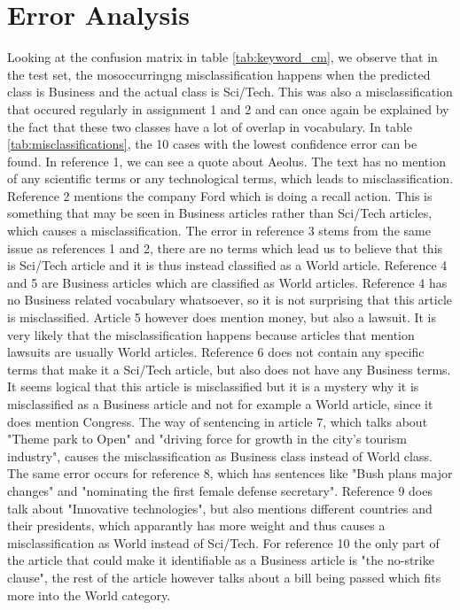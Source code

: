 \documentclass[12pt,a4paper,english]{article}
\begin{document}
\section{Error Analysis}
Looking at the confusion matrix in table \ref{tab:keyword_cm}, we observe that in the test set, the mosoccurringng misclassification happens when the predicted class is Business and the actual class is Sci/Tech. This was also a misclassification that occured regularly in assignment 1 and 2 and can once again be explained by the fact that these two classes have a lot of overlap in vocabulary. In table \ref{tab:misclassifications}, the 10 cases with the lowest confidence error can be found. In reference 1, we can see a quote about Aeolus. The text has no mention of any scientific terms or any technological terms, which leads to misclassification. Reference 2 mentions the company Ford which is doing a recall action. This is something that may be seen in Business articles rather than Sci/Tech articles, which causes a misclassification. The error in reference 3 stems from the same issue as references 1 and 2, there are no terms which lead us to believe that this is Sci/Tech article and it is thus instead classified as a World article. Reference 4 and 5 are Business articles which are classified as World articles. Reference 4 has no Business related vocabulary whatsoever, so it is not surprising that this article is misclassified. Article 5 however does mention money, but also a lawsuit. It is very likely that the misclassification happens because articles that mention lawsuits are usually World articles. Reference 6 does not contain any specific terms that make it a Sci/Tech article, but also does not have any Business terms. It seems logical that this article is misclassified but it is a mystery why it is misclassified as a Business article and not for example a World article, since it does mention Congress. The way of sentencing in article 7, which talks about "Theme park to Open" and "driving force for growth in the city's tourism industry", causes the misclassification as Business class instead of World class. The same error occurs for reference 8, which has sentences like "Bush plans major changes" and "nominating the first female defense secretary". Reference 9 does talk about "Innovative technologies", but also mentions different countries and their presidents, which apparantly has more weight and thus causes a misclassification as World instead of Sci/Tech. For reference 10 the only part of the article that could make it identifiable as a Business article is "the no-strike clause", the rest of the article however talks about a bill being passed which fits more into the World category. 
\end{document}
